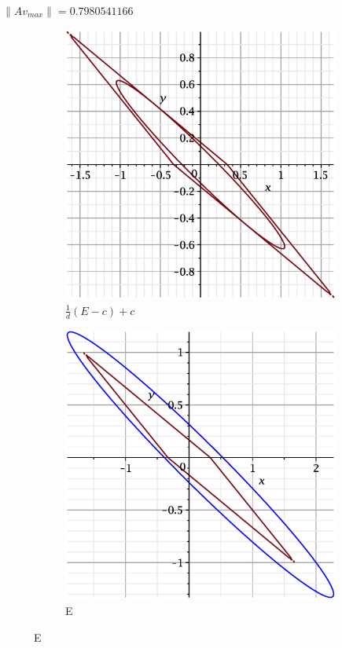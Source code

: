 \documentclass{beamer}
\begin{document}
\begin{frame}
$\|Av_{max}\| = 0.7980541166$  
    \begin{figure}
    \begin{subfigure}{.5\textwidth}
        \centering
        \includegraphics[width=.8\linewidth]{pictures/10.eps}
        \caption{$\displaystyle\frac{1}{d}(E-c)+c$}
    \label{fig:sfig1}
    \end{subfigure}%
    \begin{subfigure}{.5\textwidth}
        \centering
        \includegraphics[width=.8\linewidth]{pictures/1_10.eps}
        \caption{E}
    \label{fig:sfig2}
    \end{subfigure}
\end{figure}

\end{frame}
\end{document}
